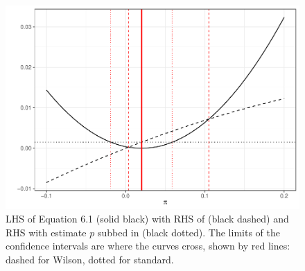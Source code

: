 \documentclass[
  openany]{book}
\theoremstyle{definition}
\theoremstyle{definition}
\theoremstyle{definition}
\theoremstyle{definition}
\theoremstyle{remark}
\begin{document}
\begin{figure}
\centering
\includegraphics{CT4H_notes_files/figure-latex/newc1-1.pdf}
\caption{\label{fig:newc1}LHS of Equation 6.1 (solid black) with RHS of (black dashed) and RHS with estimate \(p\) subbed in (black dotted). The limits of the confidence intervals are where the curves cross, shown by red lines: dashed for Wilson, dotted for standard.}
\end{figure}
\end{document}
